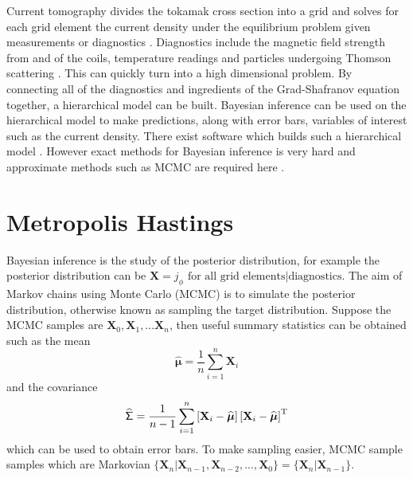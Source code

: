\documentclass[10pt]{proc}
\newcommand{\T}{^\textup{T}}
\newcommand{\dotdotdot}{...}
\newcommand{\vectGreek}[1]{\boldsymbol{#1}}
\newcommand{\matr}[1]{\mathsf{#1}}
\begin{document}
Current tomography divides the tokamak cross section into a grid and solves for each grid element the current density under the equilibrium problem given measurements or diagnostics \citep{svensson2008current}. Diagnostics include the magnetic field strength from and of the coils, temperature readings and particles undergoing Thomson scattering \citep{svensson2004integrating} \citep{ford2009bayesian}. This can quickly turn into a high dimensional problem. By connecting all of the diagnostics and ingredients of the Grad-Shafranov equation together, a hierarchical model can be built. Bayesian inference can be used on the hierarchical model to make predictions, along with error bars, variables of interest such as the current density. There exist software which builds such a hierarchical model \citep{svensson2007large} \citep{svensson2008current} \citep{svensson2010connecting}. However exact methods for Bayesian inference is  very hard and approximate methods such as MCMC are required here \citep{ford2010tokamak}.

\section{Metropolis Hastings}
Bayesian inference is the study of the posterior distribution, for example the posterior distribution can be $\mathbf{X} = j_\phi\text{ for all grid elements}|\text{diagnostics}$. The aim of Markov chains using Monte Carlo (MCMC) is to simulate the posterior distribution, otherwise known as sampling the target distribution. Suppose the MCMC samples are $\mathbf{X}_0,\mathbf{X}_1,\dotdotdot\mathbf{X}_n$, then useful summary statistics can be obtained such as the mean
\begin{equation}
\widehat{\vectGreek{\mu}} = \dfrac{1}{n}\sum_{i=1}^n \mathbf{X}_i
\end{equation}
and the covariance
\begin{equation}
\widehat{\matr{\Sigma}} = \dfrac{1}{n-1}\sum_{i=1}^n \left[\mathbf{X}_i-\widehat{\vectGreek{\mu}}\right]
\left[\mathbf{X}_i-\widehat{\vectGreek{\mu}}\right]\T
\end{equation}
which can be used to obtain error bars. To make sampling easier, MCMC sample samples which are Markovian $\{\mathbf{X}_n|\mathbf{X}_{n-1},\mathbf{X}_{n-2},\dotdotdot,\mathbf{X}_{0}\} = \{\mathbf{X}_n|\mathbf{X}_{n-1}\}$.
\end{document}
